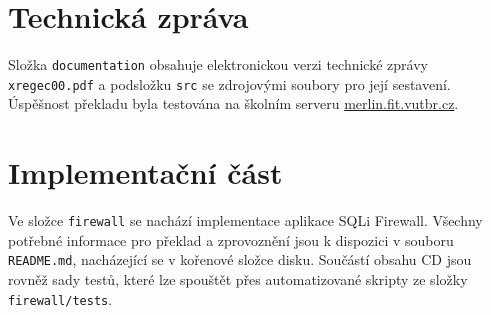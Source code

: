 \section{Technická zpráva}
Složka \texttt{documentation} obsahuje elektronickou verzi technické zprávy \texttt{xregec00.pdf} a podsložku \texttt{src} se zdrojovými soubory pro 
její sestavení. Úspěšnost překladu byla testována na školním serveru \url{merlin.fit.vutbr.cz}.

\section{Implementační část}
Ve složce \texttt{firewall} se nachází implementace aplikace SQLi Firewall. Všechny potřebné informace pro překlad a zprovoznění jsou k dispozici
v souboru \texttt{README.md}, nacházející se v kořenové složce disku. Součástí obsahu CD jsou rovněž sady testů, které lze spouštět přes automatizované
skripty ze složky \texttt{firewall/tests}. 
